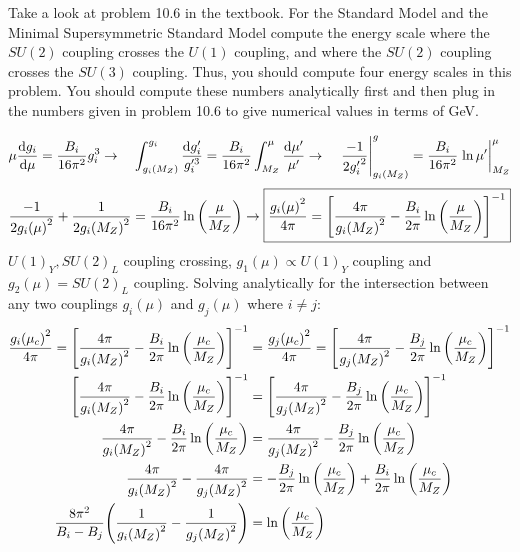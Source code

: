 \documentclass[12 pt,draft]{article}
\begin{document}
	\begin{problem}
		Take a look at problem 10.6 in the textbook. For the Standard Model and the Minimal Supersymmetric Standard Model compute the energy scale where the $SU(2)$ coupling crosses the $U(1)$ coupling, and where the $SU(2)$ coupling crosses the $SU(3)$ coupling. Thus, you should compute four energy scales in this problem. You should compute these numbers analytically first and then plug in the numbers given in problem 10.6 to give numerical values in terms of GeV.
		\answerline

		\begin{equation}
			\mu\dv{g_i}{\mu}=\oo[B_i]{16\pi^2}g^3_i
			\rightarrow\quad
			\int_{g_i(M_Z)}^{g_i}\frac{\d g_i'}{g_i'^3}
			=\oo[B_i]{16\pi^2}\int_{M_Z}^{\mu}\frac{\d \mu'}{\mu'}
			\rightarrow\quad
			\eval{\frac{-1}{2{g'_i}^2}}_{g_i(M_Z)}^{g}
			=\oo[B_i]{16\pi^2}\eval{\ln\mu'}_{M_Z}^{\mu}
		\end{equation}
		\begin{equation}
			\frac{-1}{2{g_i(\mu)}^2}+\frac{1}{2{g_i(M_Z)}^2}
			=\oo[B_i]{16\pi^2}\ln\qty(\frac{\mu}{M_Z})
			\rightarrow
			\boxed{\frac{{g_i(\mu)}^2}{4\pi}
			=\qty[\frac{4\pi}{{g_i(M_Z)}^2}-\oo[B_i]{2\pi}\ln\qty(\frac{\mu}{M_Z})]^{-1}}
		\end{equation}
		$U(1)_Y, SU(2)_L$ coupling crossing, $g_1(\mu)\propto U(1)_Y$ coupling and $g_2(\mu)= SU(2)_L$ coupling. Solving analytically for the intersection between any two couplings $g_i(\mu)$ and $g_j(\mu)$ where $i\neq j$:
		\begin{align}
			\frac{{g_i(\mu_c)}^2}{4\pi}
			=\qty[\frac{4\pi}{{g_i(M_Z)}^2}-\oo[B_i]{2\pi}\ln\qty(\frac{\mu_c}{M_Z})]^{-1}
			&=\frac{{g_j(\mu_c)}^2}{4\pi}=\qty[\frac{4\pi}{{g_j(M_Z)}^2}-\oo[B_j]{2\pi}\ln\qty(\frac{\mu_c}{M_Z})]^{-1}
			\\
			\qty[\frac{4\pi}{{g_i(M_Z)}^2}-\oo[B_i]{2\pi}\ln\qty(\frac{\mu_c}{M_Z})]^{-1}
			&=\qty[\frac{4\pi}{{g_j(M_Z)}^2}-\oo[B_j]{2\pi}\ln\qty(\frac{\mu_c}{M_Z})]^{-1}
			\\
			\frac{4\pi}{{g_i(M_Z)}^2}-\oo[B_i]{2\pi}\ln\qty(\frac{\mu_c}{M_Z})
			&=\frac{4\pi}{{g_j(M_Z)}^2}-\oo[B_j]{2\pi}\ln\qty(\frac{\mu_c}{M_Z})
			\\
			\frac{4\pi}{{g_i(M_Z)}^2}-\frac{4\pi}{{g_j(M_Z)}^2}
			&=-\oo[B_j]{2\pi}\ln\qty(\frac{\mu_c}{M_Z})+\oo[B_i]{2\pi}\ln\qty(\frac{\mu_c}{M_Z})
			\\
			\oo[8\pi^2]{B_i-B_j}\qty(\oo{{g_i(M_Z)}^2}-\oo{{g_j(M_Z)}^2})
			&=
			\ln\qty(\frac{\mu_c}{M_Z})
		\end{align}

\end{problem}
\end{document}
